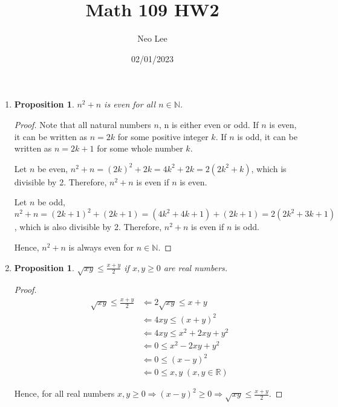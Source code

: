 \documentclass{article}
\title{Math 109 HW2}
\author{Neo Lee}
\date{02/01/2023}
\newtheorem{prop}[thm]{Proposition}
\begin{document}
 

\maketitle 

\begin{enumerate}[label={(\arabic*)}]
\item 
\begin{prop}
    $n^2 + n$ is even for all $n \in \mathbb{N}$.
\end{prop}
\begin{proof}
    Note that all natural numbers $n$, n is either even or odd.
    If $n$ is even, it can be written as $n = 2k$ for some positive integer $k$.
    If $n$ is odd, it can be written as $n = 2k + 1$ for some whole number $k$.

    Let $n$ be even, $n^2 + n = (2k)^2 + 2k = 4k^2 + 2k = 2(2k^2 + k)$, which is divisible by 2.
    Therefore, $n^2 + n$ is even if $n$ is even.

    Let $n$ be odd, $n^2 + n = (2k + 1)^2 + (2k + 1) = (4k^2 + 4k + 1) + (2k + 1) = 2(2k^2 + 3k + 1)$, which is also divisible by 2.
    Therefore, $n^2 + n$ is even if $n$ is odd.

    Hence, $n^2 + n$ is always even for $n \in \mathbb{N}$.
\end{proof}

\item 
\begin{prop}
    $\sqrt{xy} \le \frac{x + y}{2}$ if $x, y \ge 0$ are real numbers.
\end{prop}
\begin{proof}
    \begin{align}
        \sqrt{xy} \le \frac{x + y}{2} & \Leftarrow 2\sqrt{xy} \le x + y \\
        & \Leftarrow 4xy \le (x + y)^2 \\
        & \Leftarrow 4xy \le x^2 + 2xy + y^2 \\
        & \Leftarrow 0 \le x^2 - 2xy + y^2 \\ 
        & \Leftarrow 0 \le (x - y)^2 \\ 
        & \Leftarrow 0 \le x, y \; (x, y \in \mathbb{R})
    \end{align}
    
    Hence, for all real numbers $x, y \ge 0 \Rightarrow (x - y)^2 \ge 0 \Rightarrow \sqrt{xy} \le \frac{x + y}{2}$.
\end{proof}


\end{enumerate}
\end{document}
